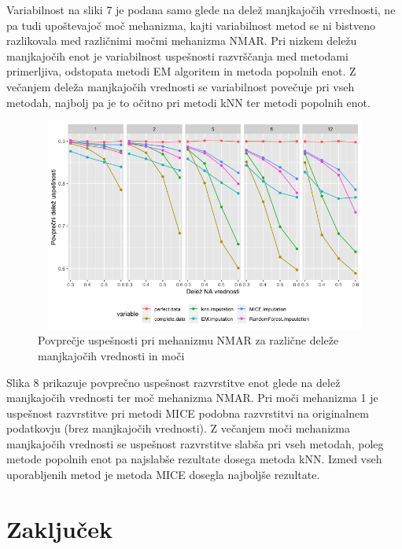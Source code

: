 \documentclass[12pt,a4paper]{article}
\begin{document}
\noindent Variabilnost na sliki 7 je podana samo glede na delež manjkajočih vrrednosti, ne pa tudi upoštevajoč moč mehanizma, kajti variabilnost metod se ni bistveno razlikovala med različnimi močmi mehanizma NMAR. Pri nizkem deležu manjkajočih enot je variabilnost uspešnosti razvrščanja med metodami primerljiva, odstopata metodi EM algoritem in metoda popolnih enot. Z večanjem deleža manjkajočih vrednosti se variabilnost povečuje pri vseh metodah, najbolj pa je to očitno pri metodi kNN ter metodi popolnih enot.

\pagebreak

\begin{figure}[ht]
	\centering
	\includegraphics[width= 12cm, height = 7cm]{img/NMAR_mean_line.png}
	\caption{Povprečje uspešnosti pri mehanizmu NMAR za različne deleže manjkajočih vrednosti in moči} 
	\label{fig:8}
\end{figure}

\noindent Slika 8 prikazuje povprečno uspešnost razvrstitve enot glede na delež manjkajočih vrednosti ter moč mehanizma NMAR. Pri moči mehanizma 1 je uspešnost razvrstitve pri metodi MICE podobna razvrstitvi na originalnem podatkovju (brez manjkajočih vrednosti). Z večanjem moči mehanizma manjkajočih vrednosti se uspešnost razvrstitve slabša pri vseh metodah, poleg metode popolnih enot pa najslabše rezultate dosega metoda kNN. Izmed vseh uporabljenih metod je metoda MICE dosegla najboljše rezultate.  


\pagebreak
\section{Zaključek}
\end{document}
